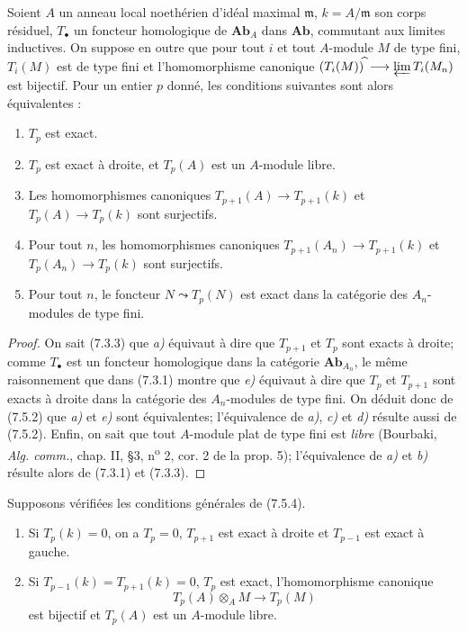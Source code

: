 \begin{proposition}[7.5.4]
Soient $A$ un anneau local noethérien d'idéal maximal $\mathfrak m$,
$k=A/\mathfrak m$ son corps résiduel, $T_\bullet$ un foncteur homologique de
$\mathbf{Ab}_A$ dans $\mathbf{Ab}$, commutant aux limites inductives. On suppose
en outre que pour tout $i$ et tout $A$-module $M$ de type fini, $T_i(M)$ est de
type fini et l'homomorphisme canonique
$(T_i(M))^{\widehat{\,}}\longrightarrow\varprojlim T_i(M_n)$
est bijectif. Pour un entier $p$ donné, les conditions suivantes sont alors
équivalentes :
\begin{enumerate}
  \item[a)] $T_p$ est exact.
  \item[b)] $T_p$ est exact à droite, et $T_p(A)$ est un $A$-module libre.
  \item[c)] Les homomorphismes canoniques
    $T_{p+1}(A)\longrightarrow T_{p+1}(k)$ et $T_p(A)\longrightarrow T_p(k)$
    sont surjectifs.
  \item[d)] Pour tout $n$, les homomorphismes canoniques
    $T_{p+1}(A_n)\longrightarrow T_{p+1}(k)$ et $T_p(A_n)\longrightarrow T_p(k)$
    sont surjectifs.
  \item[e)] Pour tout $n$, le foncteur $N\leadsto T_p(N)$ est exact dans la
    catégorie des $A_n$-modules de type fini.
\end{enumerate}
\end{proposition}

\begin{proof}
On sait (7.3.3) que \emph{a)} équivaut à dire que $T_{p+1}$ et $T_p$ sont exacts à
droite; comme $T_\bullet$ est un foncteur homologique dans la catégorie
$\boldsymbol{Ab}_{A_n}$, le même raisonnement que dans (7.3.1) montre que \emph{e)}
équivaut à dire que $T_p$ et $T_{p+1}$ sont exacts à droite dans la catégorie
des $A_n$-modules de type fini. On déduit donc de (7.5.2) que \emph{a)} et \emph{e)} sont
équivalentes; l'équivalence de \emph{a)}, \emph{c)} et \emph{d)} résulte aussi de (7.5.2). Enfin, on
sait que tout $A$-module plat de type fini est \emph{libre} (Bourbaki,
\emph{Alg. comm.}, chap. II, \S 3, n\textsuperscript{o} 2, cor. 2 de la prop.
5); l'équivalence de \emph{a)} et \emph{b)} résulte alors de (7.3.1) et (7.3.3).
\end{proof}

\begin{corollary}[7.5.5]
Supposons vérifiées les conditions générales de \textup{(7.5.4)}.
\begin{enumerate}
  \item[\textup{(i)}] Si $T_p(k)=0$, on a $T_p=0$, $T_{p+1}$ est exact à droite et
    $T_{p-1}$ est exact à gauche.
  \item[\textup{(ii)}] Si $T_{p-1}(k)=T_{p+1}(k)=0$, $T_p$ est exact,
    l'homomorphisme canonique
    \[
      T_p(A)\otimes_A M\longrightarrow T_p(M)
    \]
    est bijectif et $T_p(A)$ est un $A$-module libre.
\end{enumerate}
\end{corollary}

